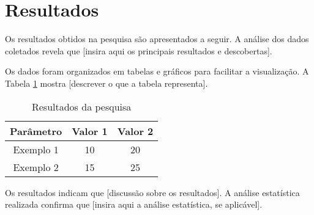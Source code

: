 \documentclass[conference]{ieee-template}
\begin{document}
\section{Resultados}
Os resultados obtidos na pesquisa são apresentados a seguir. A análise dos dados coletados revela que [insira aqui os principais resultados e descobertas]. 

Os dados foram organizados em tabelas e gráficos para facilitar a visualização. A Tabela \ref{tab:resultados} mostra [descrever o que a tabela representa]. 

\begin{table}[h]
    \centering
    \caption{Resultados da pesquisa}
    \label{tab:resultados}
    \begin{tabular}{|c|c|c|}
        \hline
        Parâmetro & Valor 1 & Valor 2 \\
        \hline
        Exemplo 1 & 10      & 20     \\
        Exemplo 2 & 15      & 25     \\
        \hline
    \end{tabular}
\end{table}



Os resultados indicam que [discussão sobre os resultados]. A análise estatística realizada confirma que [insira aqui a análise estatística, se aplicável].
\end{document}

